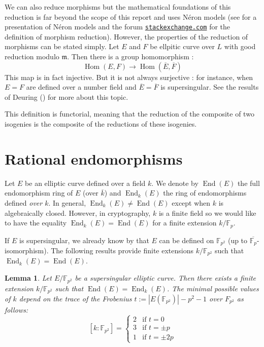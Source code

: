 \documentclass[a4paper,10pt]{report}
\theoremstyle{definition}
\theoremstyle{plain}
\newtheorem{lemma}[definition]{Lemma}
\theoremstyle{definition}
\newcommand{\F}{\mathbb{F}}
\renewcommand{\(}{\left(}
\renewcommand{\)}{\right)}
\newcommand{\mfm}{\mathfrak{m}}
\DeclareMathOperator{\Hom}{Hom}
\DeclareMathOperator{\End}{End}
\begin{document}
We can also reduce morphisms but the mathematical foundations of this reduction is far beyond the scope of this report and uses N\'{e}ron models (see \cite[chapter IV]{Silverman2} for a presentation of N\'{e}ron models and the forum \href{https://math.stackexchange.com/questions/2352060/definition-of-the-natural-reduction-map-tilde-phi-for-phie-1-to-e-2-an}{\protect\Verb+stackexchange.com+} for the definition of morphism reduction).  However,  the properties of the reduction of morphisms can be stated simply.  Let $E$ and $F$ be ellpitic curve over $L$ with good reduction modulo $\mfm$.  Then there is a group homomorphism :
\[\Hom(E,F)\longrightarrow\Hom(\overline{E},\overline{F})\]
This map is in fact injective.  But it is not always surjective : for instance,  when $E=F$ are defined over a number field and $\overline{E}=\overline{F}$ is supersingular.  See the results of Deuring (\cite[chapter 13]{Lang_EF}) for more about this topic.   

This definition is functorial,  meaning that the reduction of the composite of two isogenies is the composite of the reductions of these isogenies.  

\section{Rational endomorphisms}

Let $E$ be an elliptic curve defined over a field $k$.  We denote by $\End(E)$ the full endomorphism ring of $E$ (over $\overline{k}$) and $\End_k(E)$ the ring of endomorphisms defined \emph{over $k$}.  In general,  $\End_k(E)\neq\End(E)$ except when $k$ is algebraically closed.  However,  in cryptography,  $k$ is a finite field so we would like to have the equality $\End_k(E)=\End(E)$ for a finite extension $k/\F_p$.

If $E$ is supersingular,  we already know by \cite[theorem V.3.1]{Silverman1} that $E$ can be defined on $\F_{p^2}$ (up to $\overline{\F_p}$-isomorphism).  The following results provide finite extensions $k/\F_{p^2}$ such that $\End_k(E)=\End(E)$.

\begin{lemma}
Let $E/\F_{p^2}$ be a supersingular elliptic curve.  Then there exists a finite extension $k/\F_{p^2}$ such that $\End(E)=\End_k(E)$.  The minimal possible values of $k$ depend on the trace of the Frobenius $t:=|E(\F_{p^2})|-p^2-1$ over $F_{p^2}$ as follows:
\[[k:\F_{p^2}]=\left\{
\begin{array}{cl}
2 & \mbox{if } t=0\\
3 & \mbox{if } t=\pm p\\
1 & \mbox{if } t=\pm 2p 
\end{array}
\right.\]
\end{lemma}
\end{document}

